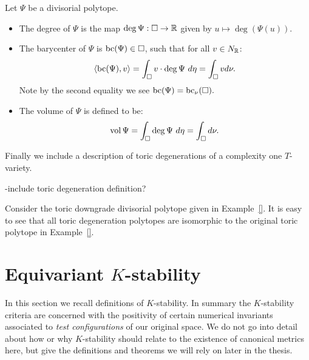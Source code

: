 \begin{definition}
Let \(\Psi\) be a divisorial polytope.
\begin{itemize}
\item The degree of \(\Psi\) is the map \( \deg \Psi : \Box \to \mathbb{R}\) given by \( u \mapsto \deg (\Psi(u))\).
\item The barycenter of \(\Psi\) is \(\mathop{\rm bc}\nolimits(\Psi) \in \Box\), such that for all \(v \in N_{\mathbb{R}}\):
\[
\langle \mathop{\rm bc}\nolimits(\Psi), v \rangle = \int_\Box v \cdot \deg \Psi \ d \eta = \int_\Box v d \nu. 
\]
Note by the second equality we see \(\mathop{\rm bc}\nolimits(\Psi) = \mathop{\rm bc}\nolimits_\nu(\Box).\)
\item The volume of \(\Psi\) is defined to be:
\[
\mathop{\rm vol}\nolimits \Psi = \int_\Box \deg \Psi \ d \eta = \int_\Box d \nu.
\]
\end{itemize}
\end{definition}
Finally we include a description of toric degenerations of a complexity one \(T\)-variety.
\begin{definition}
-include toric degeneration definition?
\end{definition}
\begin{example}
Consider the toric downgrade divisorial polytope given in Example~\ref{}. It is easy to see that all toric degeneration polytopes are isomorphic to the original toric polytope in Example~\ref{}.
\end{example}
\section{Equivariant $K$-stability} \label{sec:eqKstab}
In this section we recall definitions of \(K\)-stability. In summary the \(K\)-stability criteria are concerned with the positivity of certain numerical invariants associated to \textit{test configurations} of our original space. We do not go into detail about how or why \(K\)-stability should relate to the existence of canonical metrics here, but give the definitions and theorems we will rely on later in the thesis.

